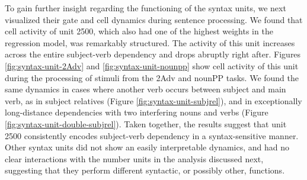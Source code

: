 To gain further insight regarding the functioning of the syntax units,
we next visualized their gate and cell dynamics during sentence
processing. We found that cell activity of unit
\unit{2}{500}, which also had one of the highest weights in the
regression model, was remarkably structured. The activity of
this unit increases across the entire subject-verb
dependency and drops abruptly right after. Figures
\ref{fig:syntax-unit-2Adv} and \ref{fig:syntax-unit-nounpp} show cell
activity of this unit during the processing of stimuli from the 2Adv
and nounPP tasks. We found the same dynamics in cases where another
verb occurs between subject and main verb, as in subject relatives
(Figure \ref{fig:syntax-unit-subjrel}), and in exceptionally
long-distance dependencies with two interfering nouns and verbs
(Figure \ref{fig:syntax-unit-double-subjrel}). Taken together, the
results suggest that unit \unit{2}{500} consistently encodes
subject-verb dependency in a syntax-sensitive manner. Other syntax
units did not show an easily interpretable dynamics, and had no clear
interactions with the number units in the analysis discussed next,
suggesting that they perform different syntactic, or possibly other, functions.